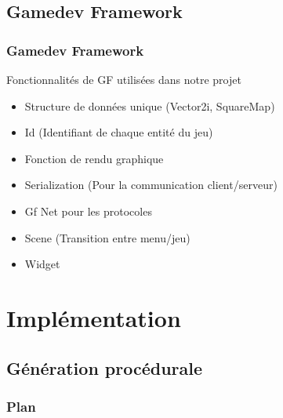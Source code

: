 \documentclass[french]{beamer}
\begin{document}
\subsection{Gamedev Framework}

\begin{frame}
\end{frame}

\begin{frame}
\frametitle{Gamedev Framework}
\begin{block}{Fonctionnalités de GF utilisées dans notre projet}
\begin{itemize}
    \item Structure de données unique (Vector2i, SquareMap)
    \item Id (Identifiant de chaque entité du jeu)
    \item Fonction de rendu graphique
    \item Serialization (Pour la communication client/serveur)
    \item Gf Net pour les protocoles
    \item Scene (Transition entre menu/jeu)
    \item Widget
\end{itemize}
\end{block}
\end{frame}


\section{Implémentation}

\subsection{Génération procédurale}

\begin{frame}
\frametitle{Plan}
\end{frame}
\end{document}
